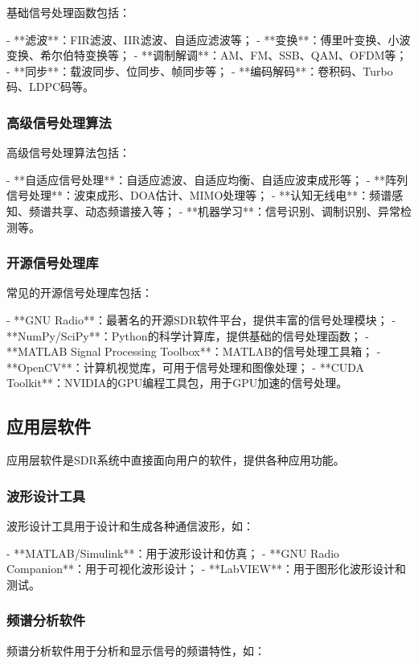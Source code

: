 ﻿\documentclass[UTF8]{ctexbook}
\begin{document}
基础信号处理函数包括：

- **滤波**：FIR滤波、IIR滤波、自适应滤波等；
- **变换**：傅里叶变换、小波变换、希尔伯特变换等；
- **调制解调**：AM、FM、SSB、QAM、OFDM等；
- **同步**：载波同步、位同步、帧同步等；
- **编码解码**：卷积码、Turbo码、LDPC码等。

\subsubsection{高级信号处理算法}

高级信号处理算法包括：

- **自适应信号处理**：自适应滤波、自适应均衡、自适应波束成形等；
- **阵列信号处理**：波束成形、DOA估计、MIMO处理等；
- **认知无线电**：频谱感知、频谱共享、动态频谱接入等；
- **机器学习**：信号识别、调制识别、异常检测等。

\subsubsection{开源信号处理库}

常见的开源信号处理库包括：

- **GNU Radio**：最著名的开源SDR软件平台，提供丰富的信号处理模块；
- **NumPy/SciPy**：Python的科学计算库，提供基础的信号处理函数；
- **MATLAB Signal Processing Toolbox**：MATLAB的信号处理工具箱；
- **OpenCV**：计算机视觉库，可用于信号处理和图像处理；
- **CUDA Toolkit**：NVIDIA的GPU编程工具包，用于GPU加速的信号处理。

\subsection{应用层软件}

应用层软件是SDR系统中直接面向用户的软件，提供各种应用功能。

\subsubsection{波形设计工具}

波形设计工具用于设计和生成各种通信波形，如：

- **MATLAB/Simulink**：用于波形设计和仿真；
- **GNU Radio Companion**：用于可视化波形设计；
- **LabVIEW**：用于图形化波形设计和测试。

\subsubsection{频谱分析软件}

频谱分析软件用于分析和显示信号的频谱特性，如：
\end{document}
